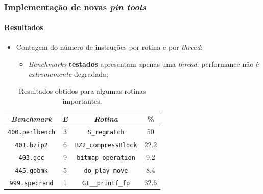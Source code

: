 \documentclass[10pt]{beamer}
\begin{document}
\begin{frame}
\frametitle{Implementação de novas \textit{pin tools}}
\framesubtitle{Resultados}

\begin{itemize}
  \item Contagem do número de instruções por rotina e por \textit{thread}:
  \begin {itemize}
    \item\textit{Benchmarks} \textbf{testados} apresentam apenas uma
    \textit{thread}: performance não é \textit{extremamente}
    degradada;
    
  \end{itemize}
  \end{itemize}
  \begin{table}[h]
\centering
\caption{\label{tab:modelos} Resultados obtidos para algumas rotinas
importantes.}
\begin{tabular}{| c | c | c | c |}
\hline

\textit{\textbf{Benchmark}} & \textit{E}  & \textit{Rotina} & \% \\	\hline \hline
\texttt{400.perlbench} & 3 & \texttt{S\_regmatch} & 50 \\\hline
\texttt{401.bzip2} & 6 & \texttt{BZ2\_compressBlock} & 22.2 \\ \hline
\texttt{403.gcc} & 9 & \texttt{bitmap\_operation} & 9.2 \\ \hline
\texttt{445.gobmk} & 5 & \texttt{do\_play\_move} & 8.4 \\ \hline
\texttt{999.specrand} & 1 &  \texttt{GI\_\_printf\_fp} & 32.6\\ \hline
\end{tabular}
\end{table}


\end{frame}
\end{document}

